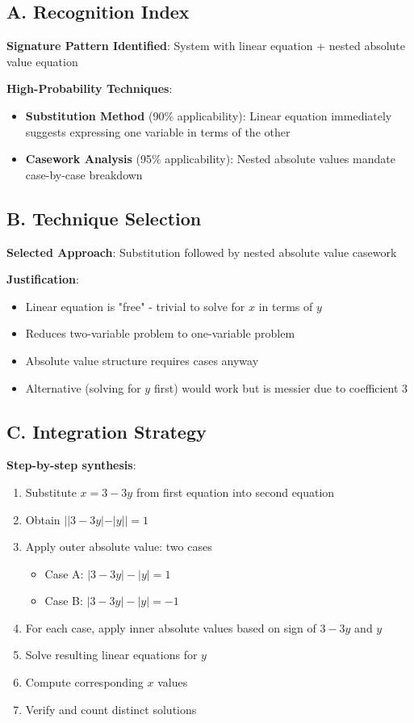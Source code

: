 \documentclass[]{article}
\begin{document}
\begin{techniquesbox}
\subsection*{A. Recognition Index}
\textbf{Signature Pattern Identified}: System with linear equation + nested absolute value equation

\textbf{High-Probability Techniques}:
\begin{itemize}[leftmargin=*]
    \item \textbf{Substitution Method} (90\% applicability): Linear equation immediately suggests expressing one variable in terms of the other
    \item \textbf{Casework Analysis} (95\% applicability): Nested absolute values mandate case-by-case breakdown
\end{itemize}

\subsection*{B. Technique Selection}
\textbf{Selected Approach}: Substitution followed by nested absolute value casework

\textbf{Justification}:
\begin{itemize}[leftmargin=*]
    \item Linear equation is "free" - trivial to solve for $x$ in terms of $y$
    \item Reduces two-variable problem to one-variable problem
    \item Absolute value structure requires cases anyway
    \item Alternative (solving for $y$ first) would work but is messier due to coefficient 3
\end{itemize}

\subsection*{C. Integration Strategy}
\textbf{Step-by-step synthesis}:
\begin{enumerate}
    \item Substitute $x = 3-3y$ from first equation into second equation
    \item Obtain $||3-3y| - |y|| = 1$
    \item Apply outer absolute value: two cases
    \begin{itemize}
        \item Case A: $|3-3y| - |y| = 1$
        \item Case B: $|3-3y| - |y| = -1$
    \end{itemize}
    \item For each case, apply inner absolute values based on sign of $3-3y$ and $y$
    \item Solve resulting linear equations for $y$
    \item Compute corresponding $x$ values
    \item Verify and count distinct solutions
\end{enumerate}


\end{techniquesbox}
\end{document}
